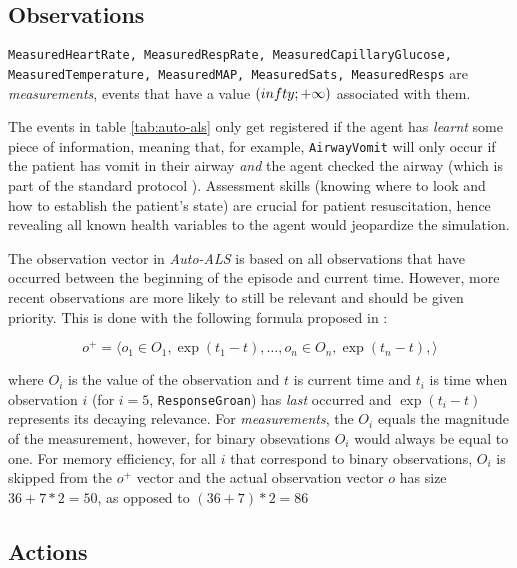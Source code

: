 \newpage
\subsection{Observations}
\label{sec:auto-als-obs}

\texttt{MeasuredHeartRate, MeasuredRespRate, MeasuredCapillaryGlucose, MeasuredTemperature, MeasuredMAP, MeasuredSats, MeasuredResps} are \emph{measurements}, events that have a value $(\-infty; +\infty)$ associated with them.

    
The events in table \ref{tab:auto-als} only get registered if the agent has \emph{learnt} some piece of information, meaning that, for example, \verb|AirwayVomit| will only occur if the patient has vomit in their airway \emph{and} the agent checked the airway (which is part of the standard protocol \cite{abcde}).
Assessment skills (knowing where to look and how to establish the patient's state) are crucial for patient resuscitation, hence revealing all known health variables to the agent would jeopardize the simulation.

The observation vector in \emph{Auto-ALS} is based on all observations that have occurred between the beginning of the episode and current time.
However, more recent observations are more likely to still be relevant and should be given priority.
This is done with the following formula proposed in \cite{liventsevReinforcementLearningMessage2021}:

\begin{equation}
     o^{+} = \langle o_1 \in O_1, \exp(t_1-t), \dots, o_n \in O_n, \exp(t_n-t), \rangle
\end{equation}

where $O_i$ is the value of the observation and $t$ is current time and $t_i$ is time when observation $i$ (for $i=5$, \verb|ResponseGroan|) has \emph{last} occurred and $\exp(t_i-t)$ represents its decaying relevance.
For \emph{measurements}, the $O_i$ equals the magnitude of the measurement, however, for binary obsevations $O_i$ would always be equal to one.
For memory efficiency, for all $i$ that correspond to binary observations, $O_i$ is skipped from the $o^{+} $ vector and the actual observation vector $o$ has size $36+7*2=50$, as opposed to $(36+7)*2=86$

\newpage
\subsection{Actions}
\label{sec:auto-als-act}

